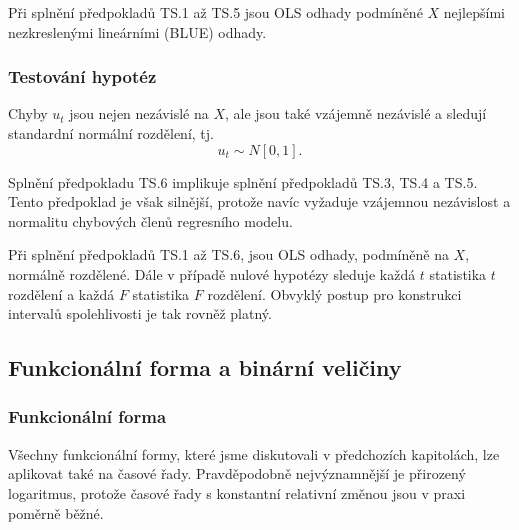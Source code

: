 \begin{theorem}
Při splnění předpokladů TS.1 až TS.5 jsou OLS odhady podmíněné 
$X$ nejlepšími nezkreslenými lineárními (BLUE) odhady.

\raggedleft{$\clubsuit$}
\end{theorem}

\subsubsection{Testování hypotéz}

\begin{assumption}[TS.6 - normalita]
Chyby $u_t$ jsou nejen nezávislé na $X$, ale jsou také vzájemně 
nezávislé a sledují standardní normální rozdělení, tj. 
\begin{equation}
u_t \sim N[0, 1].
\end{equation}

\raggedleft{$\clubsuit$}
\end{assumption}

Splnění předpokladu TS.6 implikuje splnění předpokladů TS.3, 
TS.4 a TS.5. Tento předpoklad je však silnější, protože navíc 
vyžaduje vzájemnou nezávislost a normalitu chybových členů regresního modelu.

\begin{theorem}
Při splnění předpokladů TS.1 až TS.6, jsou OLS odhady, 
podmíněně na $X$, normálně rozdělené. Dále v případě nulové 
hypotézy sleduje každá $t$ statistika $t$ rozdělení a každá $F$ 
statistika $F$ rozdělení. Obvyklý postup pro konstrukci intervalů 
spolehlivosti je tak rovněž platný.

\raggedleft{$\clubsuit$}
\end{theorem}

\subsection{Funkcionální forma a binární veličiny}

\subsubsection{Funkcionální forma}

Všechny funkcionální formy, které jsme diskutovali v předchozích 
kapitolách, lze aplikovat také na časové řady. Pravděpodobně 
nejvýznamnější je přirozený logaritmus, protože časové řady s 
konstantní relativní změnou jsou v praxi poměrně běžné.

